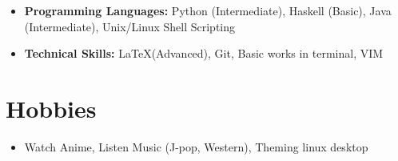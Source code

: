 \documentclass[10pt,a4paper,sans,colorlinks]{moderncv}        %
\begin{document}
\begin{itemize}

	\item \textbf{Programming Languages:} Python (Intermediate), Haskell (Basic), Java (Intermediate), Unix/Linux Shell Scripting

	\item \textbf{Technical Skills:} \LaTeX (Advanced), Git, Basic works in terminal, VIM


\end{itemize}
\section{Hobbies}

\begin{itemize}

	\item  Watch Anime, Listen Music (J-pop, Western), Theming linux desktop


\end{itemize}
%	


\end{document}
